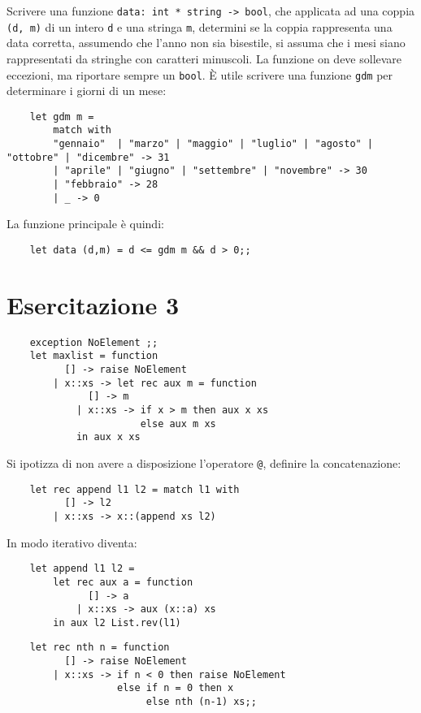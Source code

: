 \documentclass{article}
\numberwithin{equation}{subsection}
\begin{document}
Scrivere una funzione \verb|data: int * string -> bool|, che applicata ad una coppia \verb|(d, m)| di un intero \verb|d| e una stringa \verb|m|, determini se la coppia rappresenta una data corretta, assumendo che l'anno non sia bisestile, si assuma che i mesi siano rappresentati da stringhe con caratteri minuscoli. La funzione on deve sollevare eccezioni, ma riportare sempre un \verb|bool|. 
È utile scrivere una funzione \verb|gdm| per determinare i giorni di un mese:
\begin{verbatim}
    let gdm m = 
        match with
        "gennaio"  | "marzo" | "maggio" | "luglio" | "agosto" | "ottobre" | "dicembre" -> 31
        | "aprile" | "giugno" | "settembre" | "novembre" -> 30
        | "febbraio" -> 28
        | _ -> 0
\end{verbatim}
La funzione principale è quindi:
\begin{verbatim}
    let data (d,m) = d <= gdm m && d > 0;;
\end{verbatim}

\clearpage

\section{Esercitazione 3}

\begin{verbatim}
    exception NoElement ;; 
    let maxlist = function
          [] -> raise NoElement
        | x::xs -> let rec aux m = function
              [] -> m
            | x::xs -> if x > m then aux x xs
                       else aux m xs
            in aux x xs
\end{verbatim}

Si ipotizza di non avere a disposizione l'operatore \verb|@|, definire la concatenazione:
\begin{verbatim}
    let rec append l1 l2 = match l1 with
          [] -> l2
        | x::xs -> x::(append xs l2) 
\end{verbatim}
In modo iterativo diventa:
\begin{verbatim}
    let append l1 l2 =
        let rec aux a = function
              [] -> a
            | x::xs -> aux (x::a) xs
        in aux l2 List.rev(l1)
\end{verbatim}


\begin{verbatim}
    let rec nth n = function
          [] -> raise NoElement
        | x::xs -> if n < 0 then raise NoElement
                   else if n = 0 then x
                        else nth (n-1) xs;;
\end{verbatim}
\end{document}
